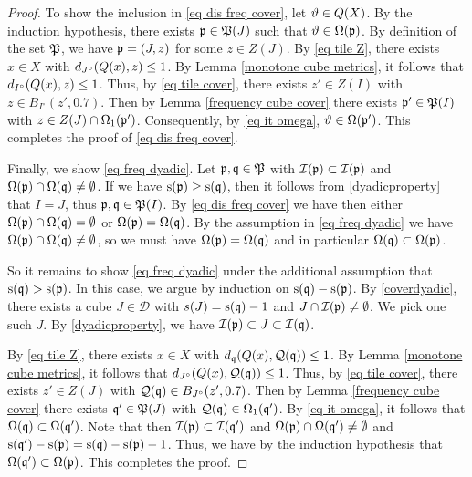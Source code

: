 {\begin{proof}
    To show the inclusion in \eqref{eq dis freq cover}, let $\vartheta \in {Q}(X)$. By the induction hypothesis, there exists $\mathfrak p \in \mathfrak P(J)$ such that $\vartheta \in \Omega(\mathfrak p)$. By definition of the set $\mathfrak P$, we have $\mathfrak p = (J, z)$ for some $z \in Z(J)$. By \eqref{eq tile Z}, there exists $x \in X$ with $d_{J^\circ}({Q}(x), z) \le 1$. By Lemma \ref{monotone cube metrics}, it follows that $d_{I^\circ}({Q}(x), z) \le 1$.
    Thus, by \eqref{eq tile cover}, there exists $z' \in Z(I)$ with $z \in B_{I^\circ}(z', 0.7)$. Then by Lemma \eqref{frequency cube cover} there exists $\mathfrak p' \in \mathfrak P(I)$ with $z \in Z(J) \cap \Omega_1(\mathfrak p')$. Consequently, by \eqref{eq it omega}, $\vartheta \in \Omega(\mathfrak p')$. This completes the proof of \eqref{eq dis freq cover}.

    Finally, we show \eqref{eq freq dyadic}. Let $\mathfrak p, \mathfrak q \in \mathfrak P$ with $\mathcal{I}(\mathfrak p) \subset \mathcal{I}(\mathfrak p)$ and $\Omega(\mathfrak p) \cap \Omega(\mathfrak q) \ne \emptyset$. If we have $\mathrm{s}(\mathfrak p) \ge \mathrm{s}(\mathfrak q)$, then it follows from \eqref{dyadicproperty} that $I = J$, thus $\mathfrak p, \mathfrak q \in \mathfrak P(I)$. By \eqref{eq dis freq cover} we have then either $\Omega(\mathfrak p) \cap \Omega(\mathfrak q) = \emptyset$ or $\Omega(\mathfrak p) = \Omega(\mathfrak q)$. By the assumption in \eqref{eq freq dyadic} we have $\Omega(\mathfrak p) \cap \Omega(\mathfrak q) \ne \emptyset$, so we must have $\Omega(\mathfrak p) = \Omega(\mathfrak q)$ and in particular $\Omega(\mathfrak q) \subset \Omega(\mathfrak p)$.

    So it remains to show \eqref{eq freq dyadic} under the additional assumption that $\mathrm{s}(\mathfrak q) > \mathrm{s}(\mathfrak p)$. In this case, we argue by induction on $\mathrm{s}(\mathfrak q)-\mathrm{s}(\mathfrak p)$. By \eqref{coverdyadic}, there exists a cube $J \in \mathcal{D}$ with $s(J) = \mathrm{s}(\mathfrak q) - 1$ and $J \cap\mathcal{I}(\mathfrak p) \ne \emptyset$. We pick one such $J$. By \eqref{dyadicproperty}, we have $\mathcal{I}(\mathfrak p) \subset J \subset \mathcal{I}(\mathfrak q)$.

    By \eqref{eq tile Z}, there exists $x \in X$ with $d_{\mathfrak q}({Q}(x), \mathcal{Q}(\mathfrak q)) \le 1$. By Lemma \ref{monotone cube metrics}, it follows that $d_{J^\circ}({Q}(x), \mathcal{Q}(\mathfrak q)) \le 1$.
    Thus, by \eqref{eq tile cover}, there exists $z' \in Z(J)$ with $\mathcal{Q}(\mathfrak q) \in B_{J^\circ}(z', 0.7)$. Then by Lemma \eqref{frequency cube cover} there exists $\mathfrak q' \in \mathfrak P(J)$ with $\mathcal{Q}(\mathfrak q) \in\Omega_1(\mathfrak q')$.
    By \eqref{eq it omega}, it follows that $\Omega(\mathfrak q) \subset \Omega(\mathfrak q')$. Note that then $\mathcal{I}(\mathfrak p) \subset \mathcal{I}(\mathfrak q')$ and $\Omega(\mathfrak p) \cap \Omega(\mathfrak q') \ne \emptyset$ and $\mathrm{s}(\mathfrak q') - \mathrm{s}(\mathfrak p) = \mathrm{s}(\mathfrak q) - \mathrm{s}(\mathfrak p) - 1$. Thus, we have by the induction hypothesis that $\Omega(\mathfrak q') \subset \Omega(\mathfrak p)$. This completes the proof.
\end{proof}

}
